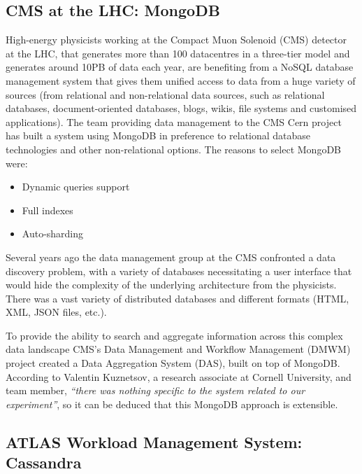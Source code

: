 \subsection{CMS at the LHC: MongoDB} %
\label{sub:cms_at_the_lhc_mongodb}
High-energy physicists working at the Compact Muon Solenoid (CMS) detector at the LHC, that generates more than 100 datacentres in a three-tier model and generates around 10PB of data each year, are benefiting from a NoSQL database management system that gives them unified access to data from a huge variety of sources (from relational and non-relational data sources, such as relational databases, document-oriented databases, blogs, wikis, file systems and customised applications). The team providing data management to the CMS Cern project has built a system using MongoDB in preference to relational database technologies and other non-relational options. The reasons to select MongoDB were:

\begin{itemize}
\item Dynamic queries support
\item Full indexes
\item Auto-sharding
\end{itemize}

Several years ago the data management group at the CMS confronted a data discovery problem, with a variety of databases necessitating a user interface that would hide the complexity of the underlying architecture from the physicists. There was a vast variety of distributed databases and different formats (HTML, XML, JSON files, etc.).

To provide the ability to search and aggregate information across this complex data landscape CMS's Data Management and Workflow Management (DMWM) project created a
Data Aggregation System (DAS),
built on
top of
MongoDB.  According to Valentin Kuznetsov, a research associate at Cornell University, and team member, \emph{``there was nothing specific to the system related to our experiment''}, so it can be deduced that this MongoDB approach is extensible. 


\subsection{ATLAS Workload Management System: Cassandra} %
\label{sub:atlas_workload_management_system_cassandra}

